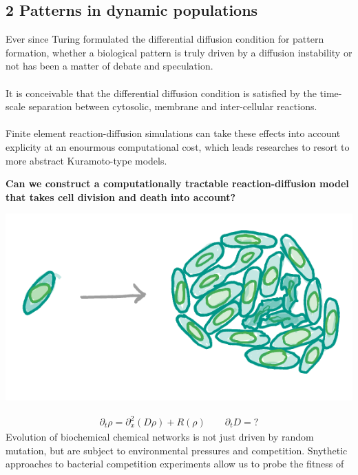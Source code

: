 \documentclass[a0,portrait]{a0poster}
\begin{document}
\begin{multicols}{3}
\section*{2 Patterns in dynamic populations}
Ever since Turing formulated the differential diffusion condition \cite{}
for pattern formation, whether a biological pattern is truly driven by a
diffusion instability or not has been a matter of debate and speculation.
\\\\
It is conceivable that the differential diffusion condition is satisfied
by the time-scale separation between cytosolic, membrane and inter-cellular
reactions.
\\\\
Finite element reaction-diffusion simulations can take these effects into
account explicity at an enourmous computational cost, which leads researches to
resort to more abstract Kuramoto-type models.
\\
\begin{tcolorbox}[boxrule=2pt,arc=3.4pt,boxsep=2mm]
\begin{center}\color{DarkRed}
\textbf{Can we construct a computationally tractable reaction-diffusion model
that takes cell division and death into account?}
\end{center}
\end{tcolorbox}
\begin{center}
\includegraphics[width=0.9\linewidth]{population}
\end{center}
\large\begin{align*}
	\partial_t\rho=\partial_x^2(D\rho)+R(\rho)\qquad
	\partial_tD=?
\end{align*}
\normalsize
Evolution of biochemical chemical networks is not just driven by random mutation,
but are subject to environmental pressures and competition. Snythetic approaches
to bacterial competition experiments \cite{} allow us to probe the fitness of

\end{multicols}
\end{document}
